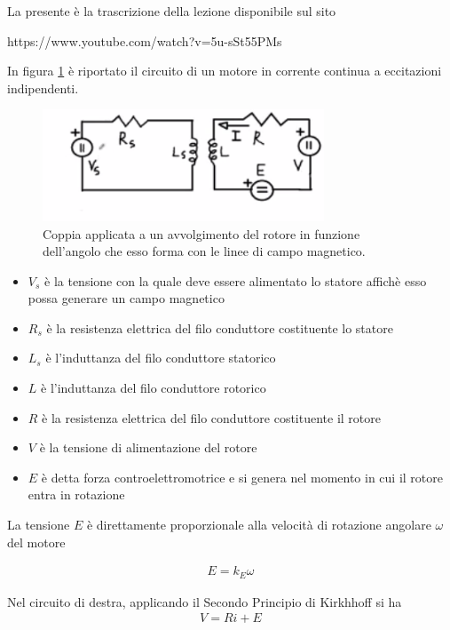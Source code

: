 \documentclass[17pt]{extarticle}
\begin{document}
La presente è la trascrizione della lezione disponibile sul sito

https://www.youtube.com/watch?v=5u-sSt55PMs

In figura \ref{fig:motoreDC_eccitazio indipendenti} è riportato il circuito di un motore in corrente continua a eccitazioni indipendenti. 


\begin{figure}[th!]
	\centering
   	\includegraphics[width=3.3in]{motoreDC_eccitazioIndipendenti.png}
  	\caption{Coppia applicata a un avvolgimento del rotore in funzione dell'angolo che esso forma con le linee di campo magnetico.}
   	\label{fig:motoreDC_eccitazio indipendenti}
\end{figure}


\begin{itemize}
	\item $V_s$ è la tensione con la quale deve essere alimentato lo statore affichè esso possa generare un campo magnetico
	\item $R_s$ è la resistenza elettrica del filo conduttore costituente lo statore
	\item $L_s$ è l'induttanza del filo conduttore statorico
	\item $L$ è l'induttanza del filo conduttore rotorico
	\item $R$ è la resistenza elettrica del filo conduttore costituente il rotore
	\item $V$ è la tensione di alimentazione del rotore
	\item $E$ è detta forza controelettromotrice e si genera nel momento in cui il rotore entra in rotazione
\end{itemize}

La tensione $E$ è direttamente proporzionale alla velocità di rotazione angolare $\omega$ del motore

\begin{eqnarray}\label{eq:controEM}
	E = k_E\omega
\end{eqnarray}

Nel circuito di destra, applicando il Secondo Principio di Kirkhhoff si ha 
\begin{eqnarray}
	V = Ri + E
\end{eqnarray}
\end{document}
